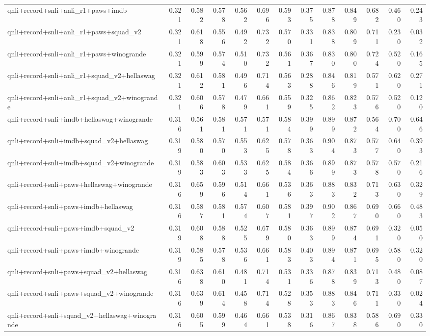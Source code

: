 \begin{table}[t]
\begin{tabular}{lrrrrrrrrrrrr}
    qnli+record+snli+anli\_r1+paws+imdb & 0.321 & 0.582 & 0.578 & 0.562 & 0.696 & 0.593 & 0.375 & 0.878 & 0.849 & 0.682 & 0.460 & 0.243 \\
    qnli+record+snli+anli\_r1+paws+squad\_v2 & 0.321 & 0.618 & 0.556 & 0.492 & 0.732 & 0.570 & 0.331 & 0.838 & 0.809 & 0.711 & 0.230 & 0.032 \\
    qnli+record+snli+anli\_r1+paws+winogrande & 0.321 & 0.599 & 0.574 & 0.510 & 0.732 & 0.561 & 0.367 & 0.830 & 0.800 & 0.724 & 0.520 & 0.165 \\
    qnli+record+snli+anli\_r1+squad\_v2+hellaswag & 0.321 & 0.612 & 0.581 & 0.496 & 0.714 & 0.563 & 0.288 & 0.846 & 0.819 & 0.571 & 0.620 & 0.271 \\
    qnli+record+snli+anli\_r1+squad\_v2+winogrande & 0.321 & 0.606 & 0.578 & 0.479 & 0.661 & 0.559 & 0.325 & 0.862 & 0.823 & 0.576 & 0.520 & 0.120 \\
    qnli+record+snli+imdb+hellaswag+winogrande & 0.316 & 0.561 & 0.581 & 0.571 & 0.571 & 0.584 & 0.399 & 0.899 & 0.872 & 0.564 & 0.700 & 0.646 \\
    qnli+record+snli+imdb+squad\_v2+hellaswag & 0.319 & 0.580 & 0.570 & 0.553 & 0.625 & 0.578 & 0.363 & 0.904 & 0.873 & 0.577 & 0.640 & 0.393 \\
    qnli+record+snli+imdb+squad\_v2+winogrande & 0.319 & 0.583 & 0.603 & 0.533 & 0.625 & 0.584 & 0.366 & 0.899 & 0.873 & 0.578 & 0.570 & 0.216 \\
    qnli+record+snli+paws+hellaswag+winogrande & 0.316 & 0.659 & 0.596 & 0.514 & 0.661 & 0.536 & 0.363 & 0.883 & 0.832 & 0.713 & 0.630 & 0.329 \\
    qnli+record+snli+paws+imdb+hellaswag & 0.316 & 0.587 & 0.581 & 0.574 & 0.607 & 0.581 & 0.397 & 0.902 & 0.867 & 0.690 & 0.660 & 0.483 \\
    qnli+record+snli+paws+imdb+squad\_v2 & 0.319 & 0.608 & 0.588 & 0.525 & 0.679 & 0.580 & 0.363 & 0.899 & 0.874 & 0.691 & 0.320 & 0.050 \\
    qnli+record+snli+paws+imdb+winogrande & 0.319 & 0.585 & 0.578 & 0.536 & 0.661 & 0.583 & 0.403 & 0.894 & 0.871 & 0.695 & 0.580 & 0.320 \\
    qnli+record+snli+paws+squad\_v2+hellaswag & 0.316 & 0.638 & 0.610 & 0.481 & 0.714 & 0.531 & 0.336 & 0.878 & 0.839 & 0.713 & 0.480 & 0.087 \\
    qnli+record+snli+paws+squad\_v2+winogrande & 0.316 & 0.639 & 0.614 & 0.458 & 0.714 & 0.528 & 0.353 & 0.883 & 0.846 & 0.711 & 0.330 & 0.024 \\
    qnli+record+snli+squad\_v2+hellaswag+winogrande & 0.316 & 0.605 & 0.599 & 0.464 & 0.661 & 0.538 & 0.316 & 0.867 & 0.838 & 0.586 & 0.690 & 0.330 \\

\end{tabular}
\end{table}
